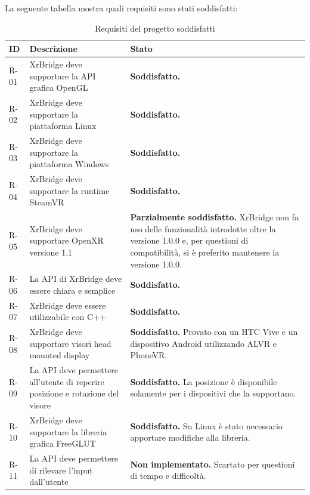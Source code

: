 \documentclass[twoside]{supsistudent}
\begin{document}
La seguente tabella mostra quali requisiti sono stati soddisfatti:

\newpage

\begin{table}[H]
  \caption{Requisiti del progetto soddisfatti}
  \begin{center}
    \begin{tabular}{ | m{1cm} | m{6cm} | m{6cm} | }
      \hline
      ID   & Descrizione & Stato \\
      \hline
      R-01 & XrBridge deve supportare la API grafica OpenGL & \textbf{Soddisfatto.} \\
      \hline
      R-02 & XrBridge deve supportare la piattaforma Linux & \textbf{Soddisfatto.} \\
      \hline
      R-03 & XrBridge deve supportare la piattaforma Windows & \textbf{Soddisfatto.} \\
      \hline
      R-04 & XrBridge deve supportare la runtime SteamVR & \textbf{Soddisfatto.} \\
      \hline
      R-05 & XrBridge deve supportare OpenXR versione 1.1 & \textbf{Parzialmente soddisfatto.} XrBridge non fa uso delle funzionalità introdotte oltre la versione 1.0.0 e, per questioni di compatibilità, si è preferito mantenere la versione 1.0.0. \\
      \hline
      R-06 & La API di XrBridge deve essere chiara e semplice & \textbf{Soddisfatto.} \\
      \hline
      R-07 & XrBridge deve essere utilizzabile con C++ & \textbf{Soddisfatto.} \\
      \hline
      R-08 & XrBridge deve supportare visori head mounted display & \textbf{Soddisfatto.} Provato con un HTC Vive e un dispositivo Android utilizzando ALVR e PhoneVR. \\
      \hline
      R-09 & La API deve permettere all'utente di reperire posizione e rotazione del visore & \textbf{Soddisfatto.} La posizione è disponibile solamente per i dispositivi che la supportano. \\
      \hline
      R-10 & XrBridge deve supportare la libreria grafica FreeGLUT & \textbf{Soddisfatto.} Su Linux è stato necessario apportare modifiche alla libreria. \\
      \hline
      R-11 & La API deve permettere di rilevare l'input dall'utente & \textbf{Non implementato.} Scartato per questioni di tempo e difficoltà. \\
      \hline
    \end{tabular}
  \end{center}
\end{table}
\end{document}

